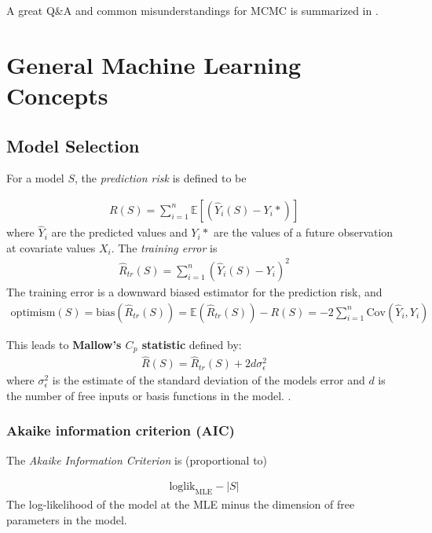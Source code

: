 \documentclass[12pt]{article}
\newcommand{\EE}{\ensuremath{\mathbb{E}}}
\begin{document}
\bigskip

A great Q\&A and common misunderstandings for MCMC is summarized in \cite{robert2020markov}.

\printbibliography[heading=subbibnumbered]
\pagebreak

\section{General Machine Learning Concepts}

\newrefsection

\subsection{Model Selection}

For a model $S$, the {\sl prediction risk} is defined to be 

\begin{align*}
  R(S) = \sum_{i=1}^n \EE[ (\hat Y_i(S) - Y_i*)]
\end{align*}
where $\hat Y_i$ are the predicted values and $Y_i*$ are the values of a future
observation at covariate values $X_i$. The {\sl training error} is
\begin{align*}
  \hat R_{tr}(S) = \sum_{i=1}^n \left(\hat Y_i(S) - Y_i \right)^2
\end{align*}
The training error is a downward biased estimator for the prediction risk, and
\begin{align*}
  \text{optimism}(S) = \text{bias}\left( \hat R_{tr}(S) \right) = \EE(\hat R_{tr}(S)) - R(S) = -2 \sum_{i=1}^n \text{Cov}(\hat Y_i, Y_i)
\end{align*}

This leads to {\bf Mallow's $C_p$ statistic} defined by:
\begin{align*}
  \hat R(S) = \hat R_{tr}(S) + 2 d \sigma_\epsilon^2
\end{align*}
where $\sigma_\epsilon^2$ is the estimate of the standard deviation of the
models error and $d$ is the number of free inputs or basis functions in the model. 
\cite[\S7.4]{esl}.




\subsubsection{Akaike information criterion (AIC)}

The {\sl Akaike Information Criterion} is (proportional to)

\begin{align*}
  \text{loglik}_{\text{MLE}} - |S|
\end{align*}
The log-likelihood of the model at the MLE minus the dimension of free
parameters in the model.
\end{document}
